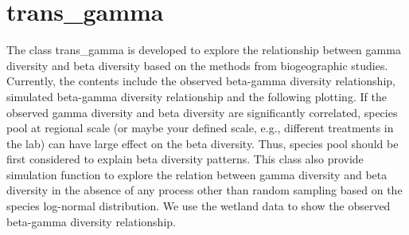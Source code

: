 \documentclass[
]{book}
\newenvironment{Shaded}{\begin{snugshade}}{\end{snugshade}}
\newcommand{\AttributeTok}[1]{\textcolor[rgb]{0.13,0.29,0.53}{#1}}
\newcommand{\CommentTok}[1]{\textcolor[rgb]{0.56,0.35,0.01}{\textit{#1}}}
\newcommand{\DecValTok}[1]{\textcolor[rgb]{0.00,0.00,0.81}{#1}}
\newcommand{\FloatTok}[1]{\textcolor[rgb]{0.00,0.00,0.81}{#1}}
\newcommand{\FunctionTok}[1]{\textcolor[rgb]{0.13,0.29,0.53}{\textbf{#1}}}
\newcommand{\NormalTok}[1]{#1}
\newcommand{\OtherTok}[1]{\textcolor[rgb]{0.56,0.35,0.01}{#1}}
\newcommand{\SpecialCharTok}[1]{\textcolor[rgb]{0.81,0.36,0.00}{\textbf{#1}}}
\newcommand{\StringTok}[1]{\textcolor[rgb]{0.31,0.60,0.02}{#1}}
\begin{document}
\begin{Shaded}
\end{Shaded}

\section{trans\_gamma}\label{trans_gamma}

The class trans\_gamma is developed to explore the relationship between gamma diversity and beta diversity
based on the methods from biogeographic studies\citep{Zhang_Local_2020}.
Currently, the contents include the observed beta-gamma diversity relationship, simulated beta-gamma diversity relationship and the following plotting.
If the observed gamma diversity and beta diversity are significantly correlated,
species pool at regional scale (or maybe your defined scale, e.g., different treatments in the lab) can have large effect on the beta diversity.
Thus, species pool should be first considered to explain beta diversity patterns.
This class also provide simulation function to explore the relation between gamma diversity and beta diversity in the absence of any process
other than random sampling based on the species log-normal distribution.
We use the wetland data to show the observed beta-gamma diversity relationship.
\end{document}
